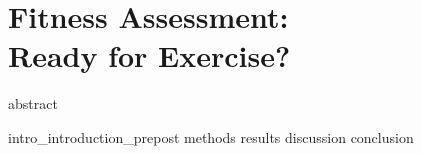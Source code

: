 \chapter{Fitness Assessment: \\ Ready for Exercise?}
\label{chapter:prepost}
\glsresetall
{abstract}



\clearpage
{intro_introduction_prepost}
{methods}
{results}
{discussion}
{conclusion}


